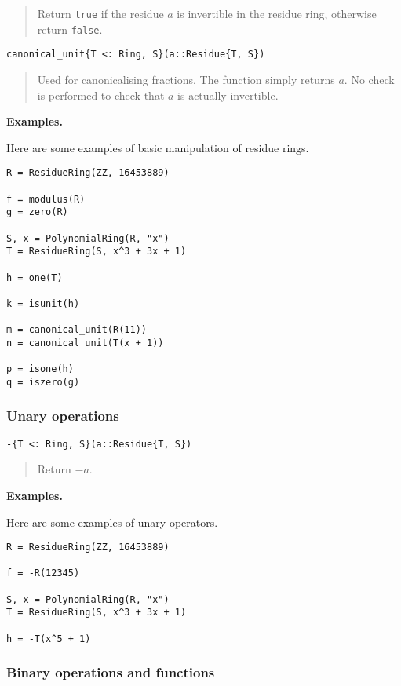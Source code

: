 \documentclass[a4paper,10pt]{article}
\newcommand{\code}{\lstinline}
\newcommand{\desc}[1]{\vspace{-3mm}\begin{quote}#1\end{quote}}
\begin{document}
{{\desc{Return \code{true} if the residue $a$ is invertible in the residue ring,
otherwise return \code{false}.}

\begin{lstlisting}
canonical_unit{T <: Ring, S}(a::Residue{T, S})
\end{lstlisting}

\desc{Used for canonicalising fractions. The function simply returns $a$. No
check is performed to check that $a$ is actually invertible.}

\textbf{Examples.}

Here are some examples of basic manipulation of residue rings.

\begin{lstlisting}
R = ResidueRing(ZZ, 16453889)

f = modulus(R)
g = zero(R)

S, x = PolynomialRing(R, "x")
T = ResidueRing(S, x^3 + 3x + 1)

h = one(T)

k = isunit(h)

m = canonical_unit(R(11))
n = canonical_unit(T(x + 1))

p = isone(h)
q = iszero(g)
\end{lstlisting}

\subsubsection{Unary operations}

\begin{lstlisting}
-{T <: Ring, S}(a::Residue{T, S})
\end{lstlisting}

\desc{Return $-a$.}

\textbf{Examples.}

Here are some examples of unary operators.

\begin{lstlisting}
R = ResidueRing(ZZ, 16453889)

f = -R(12345)

S, x = PolynomialRing(R, "x")
T = ResidueRing(S, x^3 + 3x + 1)

h = -T(x^5 + 1)
\end{lstlisting}

\subsubsection{Binary operations and functions}

}}
\end{document}
